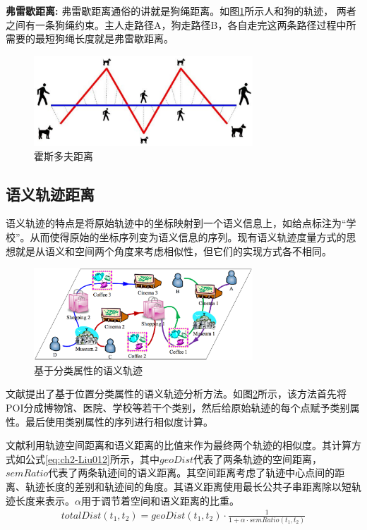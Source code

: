 \textbf{弗雷歇距离:}
弗雷歇距离通俗的讲就是狗绳距离。如图\ref{fig-chapter2-Frechet}所示人和狗的轨迹， 两者之间有一条狗绳约束。主人走路径A，狗走路径B，各自走完这两条路径过程中所需要的最短狗绳长度就是弗雷歇距离。
\begin{figure}
	\centering
	\includegraphics[width=0.73\textwidth]{Fig/chapter2/dogpeople}
	\caption{霍斯多夫距离}
	\label{fig-chapter2-Frechet}
\end{figure}

\subsection{语义轨迹距离}
语义轨迹的特点是将原始轨迹中的坐标映射到一个语义信息上，如给点标注为“学校”。从而使得原始的坐标序列变为语义信息的序列。现有语义轨迹度量方式的思想就是从语义和空间两个角度来考虑相似性，但它们的实现方式各不相同。

\begin{figure}
	\centering
	\includegraphics[width=0.73\textwidth]{Fig/chapter2/catagorySementic}
	\caption{基于分类属性的语义轨迹}
	\label{fig-chapter2-category}
\end{figure}
文献\cite{Xiao}提出了基于位置分类属性的语义轨迹分析方法。如图\ref{fig-chapter2-category}所示，该方法首先将POI分成博物馆、医院、学校等若干个类别，然后给原始轨迹的每个点赋予类别属性。最后使用类别属性的序列进行相似度计算。

文献\cite{Liu012}利用轨迹空间距离和语义距离的比值来作为最终两个轨迹的相似度。其计算方式如公式\ref{eq:ch2-Liu012}所示，其中$geoDist$代表了两条轨迹的空间距离，$semRatio$代表了两条轨迹间的语义距离。其空间距离考虑了轨迹中心点间的距离、轨迹长度的差别和轨迹间的角度。其语义距离使用最长公共子串距离除以短轨迹长度来表示。$\alpha$用于调节着空间和语义距离的比重。
\begin{eqnarray}\label{eq:ch2-Liu012}
totalDist(t_{1},t_{2}) =geoDist(t_{1},t_{2})\cdot \frac{1}{1+\alpha \cdot semRatio(t_{1},t_{2})}
\end{eqnarray}

